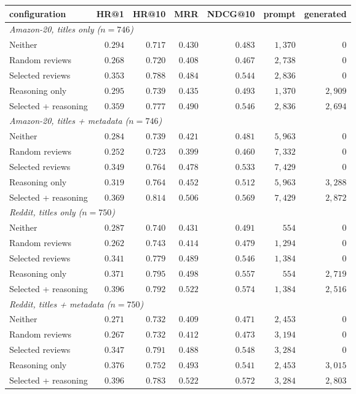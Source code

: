 \begin{tabular}{lrrrrrr}
\toprule
configuration & HR@1 & HR@10 & MRR & NDCG@10 & prompt & generated \\
\midrule\multicolumn{7}{l}{\emph{Amazon-20, titles only ($n=746$)}} \\
Neither & $0.294$ & $0.717$ & $0.430$ & $0.483$ & $1{,}370$ & $0$ \\
Random reviews & $0.268$ & $0.720$ & $0.408$ & $0.467$ & $2{,}738$ & $0$ \\
Selected reviews & $0.353$ & $0.788$ & $0.484$ & $0.544$ & $2{,}836$ & $0$ \\
Reasoning only & $0.295$ & $0.739$ & $0.435$ & $0.493$ & $1{,}370$ & $2{,}909$ \\
Selected + reasoning & $0.359$ & $0.777$ & $0.490$ & $0.546$ & $2{,}836$ & $2{,}694$ \\
\midrule\multicolumn{7}{l}{\emph{Amazon-20, titles + metadata ($n=746$)}} \\
Neither & $0.284$ & $0.739$ & $0.421$ & $0.481$ & $5{,}963$ & $0$ \\
Random reviews & $0.252$ & $0.723$ & $0.399$ & $0.460$ & $7{,}332$ & $0$ \\
Selected reviews & $0.349$ & $0.764$ & $0.478$ & $0.533$ & $7{,}429$ & $0$ \\
Reasoning only & $0.319$ & $0.764$ & $0.452$ & $0.512$ & $5{,}963$ & $3{,}288$ \\
Selected + reasoning & $0.369$ & $0.814$ & $0.506$ & $0.569$ & $7{,}429$ & $2{,}872$ \\
\midrule\multicolumn{7}{l}{\emph{Reddit, titles only ($n=750$)}} \\
Neither & $0.287$ & $0.740$ & $0.431$ & $0.491$ & $554$ & $0$ \\
Random reviews & $0.262$ & $0.743$ & $0.414$ & $0.479$ & $1{,}294$ & $0$ \\
Selected reviews & $0.341$ & $0.779$ & $0.489$ & $0.546$ & $1{,}384$ & $0$ \\
Reasoning only & $0.371$ & $0.795$ & $0.498$ & $0.557$ & $554$ & $2{,}719$ \\
Selected + reasoning & $0.396$ & $0.792$ & $0.522$ & $0.574$ & $1{,}384$ & $2{,}516$ \\
\midrule\multicolumn{7}{l}{\emph{Reddit, titles + metadata ($n=750$)}} \\
Neither & $0.271$ & $0.732$ & $0.409$ & $0.471$ & $2{,}453$ & $0$ \\
Random reviews & $0.267$ & $0.732$ & $0.412$ & $0.473$ & $3{,}194$ & $0$ \\
Selected reviews & $0.347$ & $0.791$ & $0.488$ & $0.548$ & $3{,}284$ & $0$ \\
Reasoning only & $0.376$ & $0.752$ & $0.493$ & $0.541$ & $2{,}453$ & $3{,}015$ \\
Selected + reasoning & $0.396$ & $0.783$ & $0.522$ & $0.572$ & $3{,}284$ & $2{,}803$ \\
\bottomrule
\end{tabular}
